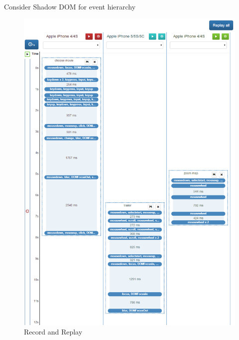 Consider Shadow DOM for event hierarchy

\begin{figure}[H]
  \centering
    \includegraphics[width=1.0\textwidth]{images/screenshots/record_replay.png}
	\caption{Record and Replay}
	\label{fig:record_replay}
\end{figure}